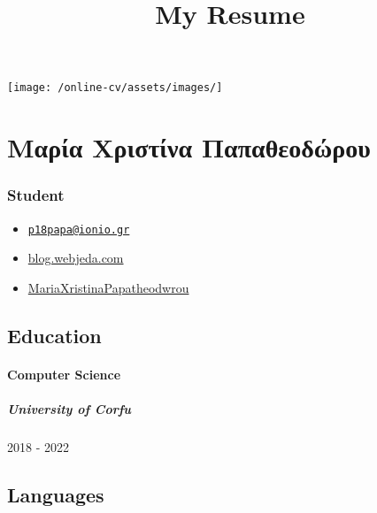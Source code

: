 \documentclass[english,]{article}
\title{My Resume}
\date{}
\providecommand{\tightlist}{%
  \setlength{\itemsep}{0pt}\setlength{\parskip}{0pt}}
\let\oldparagraph\paragraph
\renewcommand{\paragraph}[1]{\oldparagraph{#1}\mbox{}}
\let\oldsubparagraph\subparagraph
\renewcommand{\subparagraph}[1]{\oldsubparagraph{#1}\mbox{}}
\begin{document}
\maketitle

\texttt{[image: /online-cv/assets/images/]}

\hypertarget{ux3bcux3b1ux3c1ux3afux3b1-ux3c7ux3c1ux3b9ux3c3ux3c4ux3afux3bdux3b1-ux3c0ux3b1ux3c0ux3b1ux3b8ux3b5ux3bfux3b4ux3ceux3c1ux3bfux3c5}{%
\section{Μαρία Χριστίνα
Παπαθεοδώρου}\label{ux3bcux3b1ux3c1ux3afux3b1-ux3c7ux3c1ux3b9ux3c3ux3c4ux3afux3bdux3b1-ux3c0ux3b1ux3c0ux3b1ux3b8ux3b5ux3bfux3b4ux3ceux3c1ux3bfux3c5}}

\hypertarget{student}{%
\subsubsection{Student}\label{student}}

\begin{itemize}
\tightlist
\item
  \emph{} \href{mailto:p18papa@ionio.gr}{\nolinkurl{p18papa@ionio.gr}}
\item
  \emph{} \href{http://blog.webjeda.com}{blog.webjeda.com}
\item
  \emph{}
  \href{http://github.com/MariaXristinaPapatheodwrou}{MariaXristinaPapatheodwrou}
\end{itemize}

\hypertarget{education}{%
\subsection{Education}\label{education}}

\hypertarget{computer-science}{%
\paragraph{Computer Science}\label{computer-science}}

\hypertarget{university-of-corfu}{%
\subparagraph{University of Corfu}\label{university-of-corfu}}

2018 - 2022

\hypertarget{languages}{%
\subsection{Languages}\label{languages}}
\end{document}
